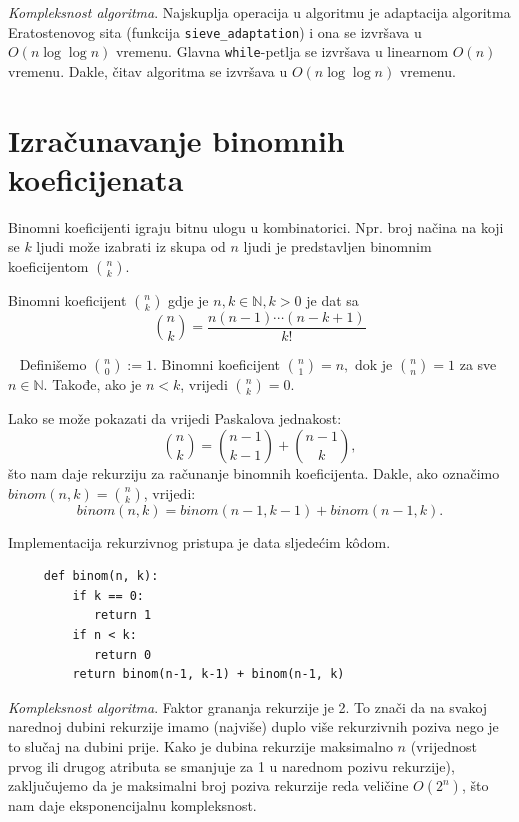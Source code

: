 \textit{Kompleksnost algoritma}. Najskuplja operacija u algoritmu je adaptacija algoritma Eratostenovog sita (funkcija \texttt{sieve\_adaptation}) i ona se izvršava u $O(n \log \log n)$ vremenu. Glavna \texttt{while}-petlja se izvršava u linearnom $O(n)$ vremenu. Dakle, čitav algoritma se izvršava u 
 $O(n \log \log n)$ vremenu.
 
  \section{Izračunavanje binomnih koeficijenata} 
  
  Binomni koeficijenti igraju bitnu ulogu u kombinatorici. Npr. broj načina na koji se $k$ ljudi može izabrati iz skupa od $n$ ljudi je predstavljen binomnim koeficijentom $\binom{n}{k}$. 
  
  \begin{definition}
  	 Binomni koeficijent $\binom{n}{k}$ gdje je $n, k \in \mathbb{N}, k > 0$  je dat sa 
  	 $$\binom{n}{k} = \frac{n(n-1) \cdots (n-k+1)}{k!}$$
  \end{definition}
  
~ Definišemo $\binom{n}{0} := 1$. Binomni koeficijent $\binom{n}{1} = n,$ dok je $\binom{n}{n} = 1$ za sve $n \in \mathbb{N}.$ Takođe, ako je $n <k$, vrijedi $\binom{n}{k}=0$.
 
  Lako se može pokazati da vrijedi Paskalova jednakost:
  $$ \binom{n}{k} = \binom{n-1}{k-1} + \binom{n-1}{k},$$
   što nam daje rekurziju za računanje binomnih koeficijenta. Dakle, ako označimo $binom(n, k) = \binom{n}{k}$, vrijedi:
   $$ binom(n, k)= binom(n-1, k-1) + binom(n-1, k).$$
   
   Implementacija rekurzivnog pristupa je data sljedećim k\^odom.
   
   \begin{verbatim}
     def binom(n, k): 
         if k == 0:
            return 1
         if n < k:
            return 0
         return binom(n-1, k-1) + binom(n-1, k)
   \end{verbatim}
  \textit{Kompleksnost algoritma}. Faktor grananja rekurzije je 2. To znači da na svakoj narednoj dubini rekurzije imamo (najviše) duplo više rekurzivnih poziva nego je to slučaj na dubini prije.  Kako je dubina rekurzije maksimalno $n$ (vrijednost prvog ili drugog atributa se smanjuje za 1 u narednom pozivu rekurzije), zaključujemo da je maksimalni broj poziva rekurzije reda veličine $O(2^n)$, što nam daje eksponencijalnu kompleksnost. \\
  
